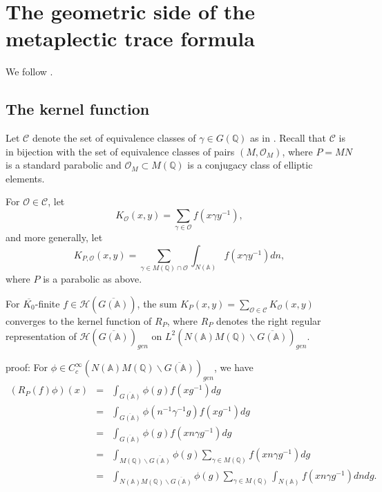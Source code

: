 \section{The geometric side of the metaplectic trace formula}\label{sec:geometric}

We follow \cite{A2,A3}.

\subsection{The kernel function}

Let ${\mathcal{C}}$ denote the set of equivalence classes of
$\gamma \in G({\mathbb{Q}})$ as in \cite[section 2]{A2}.
Recall that ${\mathcal{C}}$ is in bijection
with the set of equivalence classes of pairs $(M,{\mathcal{O}}_M)$,
where $P=MN $ is a standard parabolic and
${\mathcal{O}}_M\subset M({\mathbb{Q}})$ is a
conjugacy class of elliptic elements.

For ${\mathcal{O}}\in {\mathcal{C}}$, let 
\[
K_{{\mathcal{O}}}(x,y)=\sum_{\gamma \in {\mathcal{O}}}f(x\gamma y^{-1}),
\]
and more generally, let 
\begin{equation}\label{eq:4.1}
K_{P,{\mathcal{O}}}(x,y)=\sum_{\gamma \in M({\mathbb{Q}})\cap {\mathcal{O}}}
\int_{N({\mathbb{A}})}f(x\gamma y^{-1})dn,
\end{equation}
where $P$ is a parabolic as above.

\begin{lemma}\label{lem:4.1}
For $\overline{K_0}$-finite
$f\in {\mathcal{H}}(\overline{G({\mathbb{A}})})$, the sum
$K_P(x,y)=\sum_{{\mathcal{O}}\in {\mathcal{C}}}K_{{\mathcal{O}}}(x,y)$
converges to the kernel
function of $R_P$, where $R_P$ denotes the right
regular representation of
${\mathcal{H}}(\overline{G({\mathbb{A}})})_{gen}$ on
$L^2(N({\mathbb{A}})M({\mathbb{Q}})\backslash \overline{G({\mathbb{A}})})_{gen}$.
\end{lemma}

proof: For
$\phi \in C_c^\infty (N({\mathbb{A}})M({\mathbb{Q}})
\backslash \overline{G({\mathbb{A}})})_{gen}$, we have 
\begin{eqnarray*}
(R_P(f)\phi )(x) &=&\int_{\overline{G({\mathbb{A}})}}\phi (g)f(xg^{-1})dg \\
&=&\int_{\overline{G({\mathbb{A}})}}\phi (n^{-1}\gamma ^{-1}g)f(xg^{-1})dg \\
&=&\int_{\overline{G({\mathbb{A}})}}\phi (g)f(xn\gamma g^{-1})dg \\
&=&\int_{M({\mathbb{Q}})\backslash \overline{G({\mathbb{A}})}}\phi (g)\sum_{\gamma \in
M({\mathbb{Q}})}f(xn\gamma g^{-1})dg \\
&=&\int_{N({\mathbb{A}})M({\mathbb{Q}})\backslash \overline{G({\mathbb{A}})}}\phi
(g)\sum_{\gamma \in M({\mathbb{Q}})}\int_{N({\mathbb{A}})}f(xn\gamma g^{-1})dndg.
\end{eqnarray*}

